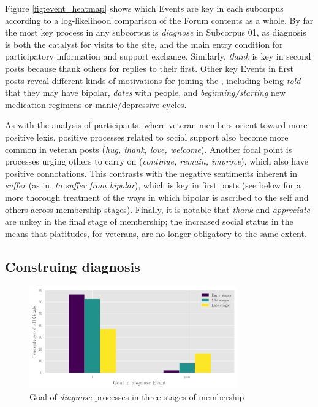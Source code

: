 Figure \ref{fig:event_heatmap} shows which Events are key in each subcorpus according to a log\hyp{}likelihood comparison of the \gls{Forum} contents as a whole. By far the most key process in any subcorpus is \emph{diagnose} in Subcorpus 01, as diagnosis is both the catalyst for visits to the site, and the main entry condition for participatory information and support exchange. Similarly, \emph{thank} is key in second \glspl{post} because  thank others for replies to their first. Other key Events in first \glspl{post} reveal different kinds of motivations for joining the , including being \emph{told} that they may have \gls{bipolar}, \emph{dates} with  people, and \emph{beginning\slash starting} new medication regimens or manic\slash depressive cycles.

As with the analysis of participants, where veteran \glspl{member} orient toward more positive lexis, positive processes related to social support also become more common in veteran \glspl{post} (\emph{hug, thank, love, welcome}). Another focal point is processes urging others to carry on (\emph{continue, remain, improve}), which also have positive connotations. This contrasts with the negative sentiments inherent in \emph{suffer} (as in, \emph{to suffer from bipolar}), which is key in first \glspl{post} (see below for a more thorough treatment of the ways in which bipolar is ascribed to the self and others across membership stages). Finally, it is notable that \emph{thank} and \emph{appreciate} are unkey in the final stage of membership; the increased social status in the  means that platitudes, for veterans, are no longer obligatory to the same extent.

\subsection{Construing diagnosis} \label{sect:diag}


\begin{figure}[htb]
    \centering
    \includegraphics[width=0.8\textwidth]{../images/goal-in-diag-ev.png}
    \caption[Goal of \emph{diagnose} processes]{Goal of \emph{diagnose} processes in three stages of membership}
    \label{fig:part_in_diag}
    \end{figure}

